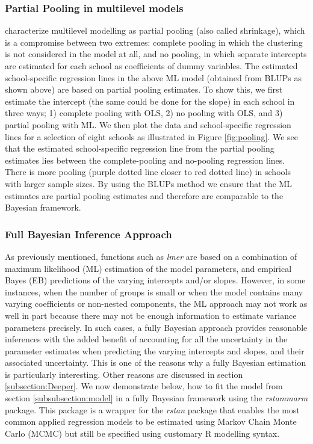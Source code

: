 \subsubsection*{Partial Pooling in multilevel models}
\cite{gelman2006data} characterize multilevel modelling as partial pooling (also called shrinkage), which is a compromise between two extremes: complete pooling in which the clustering is not considered in the model at all, and no pooling, in which separate intercepts are estimated for each school as coefficients of dummy variables. The estimated school-specific regression lines in the above ML model (obtained from BLUPs as shown above) are based on partial pooling estimates. To show this, we first estimate the intercept (the same could be done for the slope) in each school in three ways; 1) complete pooling with OLS, 2) no pooling with OLS, and 3) partial pooling with ML. We then plot the data and school-specific regression lines for a selection of eight schools as illustrated in Figure \ref{fig:pooling}. We see that the estimated school-specific regression line from the partial pooling estimates lies between the complete-pooling and no-pooling regression lines. There is more pooling (purple dotted line closer to red dotted line) in schools with larger sample sizes. By using the BLUPs method we ensure that the ML estimates are partial pooling estimates and therefore are comparable to the Bayesian framework.

\subsubsection{Full Bayesian Inference Approach}
As previously mentioned, functions such as \textit{lmer} are based on a combination of maximum likelihood (ML) estimation of the model parameters, and empirical Bayes (EB) predictions of the varying intercepts and/or slopes. However, in some instances, when the number of groups is small or when the model contains many varying coefficients or non-nested components, the ML approach may not work as well in part because there may not be enough information to estimate variance parameters precisely. In such cases, a fully Bayesian approach provides reasonable inferences with the added benefit of accounting for all the uncertainty in the parameter estimates when predicting the varying intercepts and slopes, and their associated uncertainty. This is one of the reasons why a fully Bayesian estimation is particularly interesting. Other reasons are discussed in section \ref{subsection:Deeper}. We now demonstrate below, how to fit the model from section \ref{subsubsection:model} in a fully Bayesian framework using the \textit{rstammarm} package. This package is a wrapper for the \textit{rstan} package that enables the most common applied regression models to be estimated using Markov Chain Monte Carlo (MCMC) but still be specified using customary R modelling syntax.

